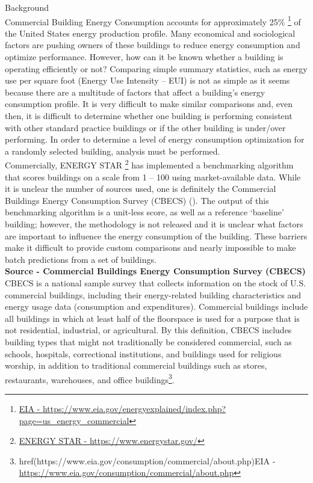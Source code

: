 {\Large {Background}}
\\[0.125in]
Commercial Building Energy Consumption accounts for approximately 25\% \footnote{\href{https://www.eia.gov/energyexplained/index.php?page=us_energy_commercial}{EIA - \url{https://www.eia.gov/energyexplained/index.php?page=us_energy_commercial}}} of the United States energy production profile.  Many economical and sociological factors are pushing owners of these buildings to reduce energy consumption and optimize performance.  However, how can it be known whether a building is operating efficiently or not?  Comparing simple summary statistics, such as energy use per square foot (Energy Use Intensity – EUI) is not as simple as it seems because there are a multitude of factors that affect a building’s energy consumption profile.  It is very difficult to make similar comparisons and, even then, it is difficult to determine whether one building is performing consistent with other standard practice buildings or if the other building is under/over performing.  In order to determine a level of energy consumption optimization for a randomly selected building, analysis must be performed. 
\\[0.125in]
Commercially, ENERGY STAR \footnote{\href{https://www.energystar.gov/}{ENERGY STAR - \url{https://www.energystar.gov/}}} has implemented a benchmarking algorithm that scores buildings on a scale from 1 – 100 using market-available data.  While it is unclear the number of sources used, one is definitely the Commercial Buildings Energy Consumption Survey (CBECS) ().  The output of this benchmarking algorithm is a unit-less score, as well as a reference ‘baseline’ building; however, the methodology is not released and it is unclear what factors are important to influence the energy consumption of the building.  These barriers make it difficult to provide custom comparisons and nearly impossible to make batch predictions from a set of buildings.
\\[0.125in]
\textbf{Source - Commercial Buildings Energy Consumption Survey (CBECS)}
\\[0.0625in]
CBECS is a national sample survey that collects information on the stock of U.S. commercial buildings, including their energy-related building characteristics and energy usage data (consumption and expenditures). Commercial buildings include all buildings in which at least half of the floorspace is used for a purpose that is not residential, industrial, or agricultural. By this definition, CBECS includes building types that might not traditionally be considered commercial, such as schools, hospitals, correctional institutions, and buildings used for religious worship, in addition to traditional commercial buildings such as stores, restaurants, warehouses, and office buildings\footnote{href{(https://www.eia.gov/consumption/commercial/about.php)}{EIA - \url{https://www.eia.gov/consumption/commercial/about.php}}}.